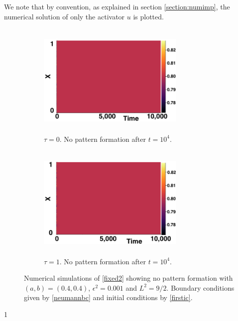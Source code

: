 We note that by convention, as explained in section \ref{section:numimp}, the numerical solution of only the activator $u$ is plotted.
\begin{figure}[H]
    \centering
    \begin{subfigure}[t]{0.45\textwidth}
        \centering
        \includegraphics[width=7cm,height = 5.5cm]{nopatt1.png}
        \caption{$\tau=0$. No pattern formation after $t=10^4$. }
        \label{}
    \end{subfigure}
    \hfill
    \begin{subfigure}[t]{0.45\textwidth}
        \centering
        \includegraphics[width=7cm,height = 5.5cm]{nopatt2.png}
        \caption{$\tau=1.$ No pattern formation after $t=10^4$.}
        \label{}
    \end{subfigure}
    \caption{Numerical simulations of \eqref{fixed2} showing no pattern formation with $(a,b)=(0.4,0.4)$, $\epsilon^2=0.001$ and $L^2=9/2$. Boundary conditions given by \eqref{neumannbc} and initial conditions by \eqref{firstic}.}
    \label{fig:fixedsim1}
\end{figure}1

